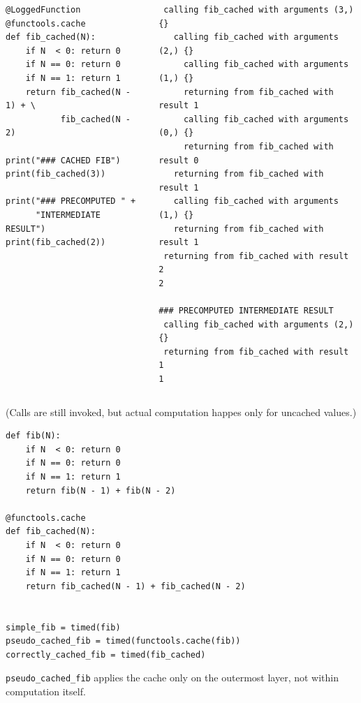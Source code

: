 \begin{frame}[fragile]
%
\begin{columns}
\begin{codebox}[Cached Fibonacci, equal height group=cachedFib]
\begin{verbatim}
@LoggedFunction
@functools.cache
def fib_cached(N):
    if N  < 0: return 0
    if N == 0: return 0
    if N == 1: return 1
    return fib_cached(N - 1) + \
           fib_cached(N - 2)

print("### CACHED FIB")
print(fib_cached(3))

print("### PRECOMPUTED " +
      "INTERMEDIATE RESULT")
print(fib_cached(2))
\end{verbatim}
\end{codebox}
%
\begin{cmdbox}[Output: Cached Fibonacci, equal height group=cachedFib]
\begin{verbatim}
 calling fib_cached with arguments (3,) {}
   calling fib_cached with arguments (2,) {}
     calling fib_cached with arguments (1,) {}
     returning from fib_cached with result 1
     calling fib_cached with arguments (0,) {}
     returning from fib_cached with result 0
   returning from fib_cached with result 1
   calling fib_cached with arguments (1,) {}
   returning from fib_cached with result 1
 returning from fib_cached with result 2
2

### PRECOMPUTED INTERMEDIATE RESULT
 calling fib_cached with arguments (2,) {}
 returning from fib_cached with result 1
1
\end{verbatim}
\end{cmdbox}
\end{columns}
%
(Calls are still invoked, but actual computation happes only for uncached values.)
%
\end{frame}


\begin{frame}[fragile]
%
\begin{codebox}
\begin{verbatim}
def fib(N):
    if N  < 0: return 0
    if N == 0: return 0
    if N == 1: return 1
    return fib(N - 1) + fib(N - 2)

@functools.cache
def fib_cached(N):
    if N  < 0: return 0
    if N == 0: return 0
    if N == 1: return 1
    return fib_cached(N - 1) + fib_cached(N - 2)


simple_fib = timed(fib)
pseudo_cached_fib = timed(functools.cache(fib))
correctly_cached_fib = timed(fib_cached)
\end{verbatim}
\end{codebox}
%
\begin{hintbox}[]
\footnotesize
\texttt{pseudo\_cached\_fib} applies the cache only on the outermost layer, not within computation itself.
\end{hintbox}
%
\end{frame}

